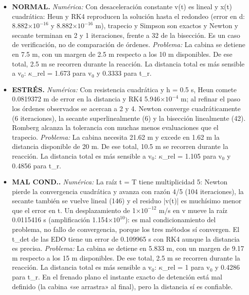 \begin{itemize}
\item \textbf{NORMAL.} \emph{Numérica:} Con desaceleración constante v(t) es lineal y x(t) cuadrática: Heun y RK4 reproducen la solución hasta el redondeo (error en d: 8.882$\times10^{-16}$ y 8.882$\times10^{-16}$ m), trapecio y Simpson son exactos y Newton y secante terminan en 2 y 1 iteraciones, frente a 32 de la bisección. Es un caso de verificación, no de comparación de órdenes. \emph{Problema:} La cabina se detiene en 7.5 m, con un margen de 2.5 m respecto a los 10 m disponibles. De ese total, 2.5 m se recorren durante la reacción. La distancia total es más sensible a v$_{0}$: $\kappa$\_rel = 1.673 para v$_{0}$ y 0.3333 para t\_r.
\item \textbf{ESTRÉS.} \emph{Numérica:} Con resistencia cuadrática y h = 0.5 s, Heun comete 0.0819372 m de error en la distancia y RK4 5.946$\times10^{-4}$ m; al refinar el paso los órdenes observados se acercan a 2 y 4. Newton converge cuadráticamente (6 iteraciones), la secante superlinealmente (6) y la bisección linealmente (42). Romberg alcanza la tolerancia con muchas menos evaluaciones que el trapecio. \emph{Problema:} La cabina necesita 21.62 m y excede en 1.62 m la distancia disponible de 20 m. De ese total, 10.5 m se recorren durante la reacción. La distancia total es más sensible a v$_{0}$: $\kappa$\_rel = 1.105 para v$_{0}$ y 0.4856 para t\_r.
\item \textbf{MAL COND..} \emph{Numérica:} La raíz t = T tiene multiplicidad 5: Newton pierde la convergencia cuadrática y avanza con razón 4/5 (104 iteraciones), la secante también se vuelve lineal (146) y el residuo |v(t)| es muchísimo menor que el error en t. Un desplazamiento de 1$\times10^{-12}$ m/s en v mueve la raíz 0.0115416 s (amplificación 1.154$\times10^{10}$): es mal condicionamiento del problema, no fallo de convergencia, porque los tres métodos sí convergen. El t\_det de las EDO tiene un error de 0.109965 s con RK4 aunque la distancia es precisa. \emph{Problema:} La cabina se detiene en 5.833 m, con un margen de 9.17 m respecto a los 15 m disponibles. De ese total, 2.5 m se recorren durante la reacción. La distancia total es más sensible a v$_{0}$: $\kappa$\_rel = 1 para v$_{0}$ y 0.4286 para t\_r. En el frenado plano el instante exacto de detención está mal definido (la cabina «se arrastra» al final), pero la distancia sí es confiable.
\end{itemize}
